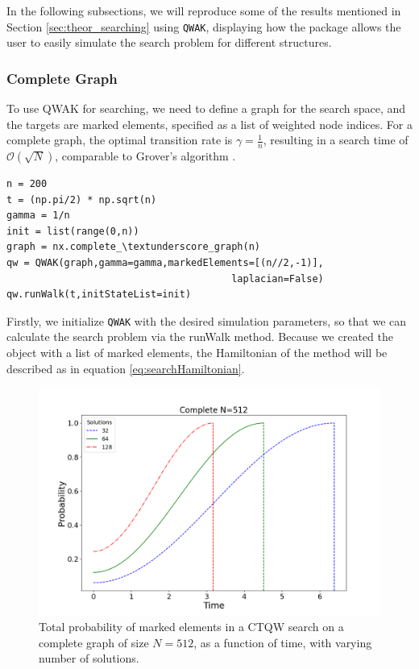 \documentclass[main.tex]{subfiles}
\begin{document}
In the following subsections, we will reproduce some of the results mentioned
in Section \ref{sec:theor_searching} using \texttt{QWAK}, displaying how the
package allows the user to easily simulate the search problem for different
structures.

\subsubsection{Complete Graph}
To use QWAK for searching, we need to define a graph for the search space, and
the targets are marked elements, specified as a list of weighted node indices.
For a complete graph, the optimal transition rate is \(\gamma = \frac{1}{n}\),
resulting in a search time of \(\mathcal{O}(\sqrt{N})\), comparable to Grover's
algorithm \cite{farhi1996, childs2004}.

\begin{lstlisting}[style=code,escapeinside={__}]
n = 200
t = (np.pi/2) * np.sqrt(n)
gamma = 1/n
init = list(range(0,n))
graph = nx.complete_\textunderscore_graph(n)
qw = QWAK(graph,gamma=gamma,markedElements=[(n//2,-1)],
                                       laplacian=False)
qw.runWalk(t,initStateList=init)
\end{lstlisting}

Firstly, we initialize \texttt{QWAK} with the desired simulation
parameters, so that we can calculate the search problem via the runWalk method.
Because we created the object with a list of marked elements, the Hamiltonian
of the method will be described as in equation
\eqref{eq:searchHamiltonian}.\par

\begin{figure}[!h]
    \centering
    \includegraphics[scale=\mysinglefigurescale]{completePlot_N512_NWALKS3_S200.png}
    \caption{Total probability of marked elements in a CTQW search on a
    complete graph of size $N=512$, as a function of time, with varying number
    of solutions.} 
    \label{fig:multipleElementCompleteGraph}
\end{figure}
\end{document}
